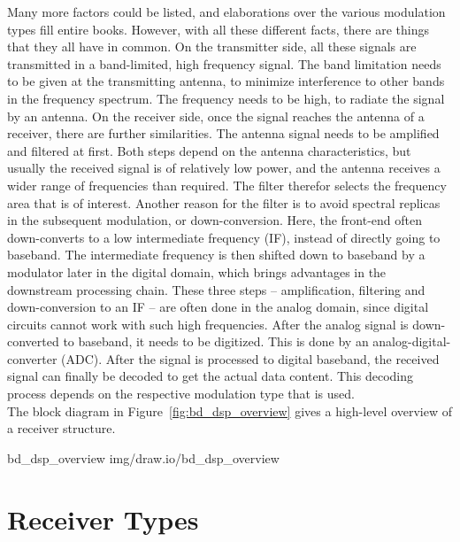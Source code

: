 Many more factors could be listed, and elaborations over the various modulation types fill entire books.
However, with all these different facts, there are things that they all have in common.
On the transmitter side, all these signals are transmitted in a band-limited, high frequency signal.
The band limitation needs to be given at the transmitting antenna, to minimize interference to other bands in the frequency spectrum.
The frequency needs to be high, to radiate the signal by an antenna.
On the receiver side, once the signal reaches the antenna of a receiver, there are further similarities.
The antenna signal needs to be amplified and filtered at first.
Both steps depend on the antenna characteristics, but usually the received signal is of relatively low power, and the antenna receives a wider range of frequencies than required.
The filter therefor selects the frequency area that is of interest.
Another reason for the filter is to avoid spectral replicas in the subsequent modulation, or down-conversion.
Here, the front-end often down-converts to a low intermediate frequency (IF), instead of directly going to baseband.
The intermediate frequency is then shifted down to baseband by a modulator later in the digital domain, which brings advantages in the downstream processing chain. %
These three steps -- amplification, filtering and down-conversion to an IF -- are often done in the analog domain, since digital circuits cannot work with such high frequencies.
After the analog signal is down-converted to baseband, it needs to be digitized.
This is done by an analog-digital-converter (ADC).
After the signal is processed to digital baseband, the received signal can finally be decoded to get the actual data content.
This decoding process depends on the respective modulation type that is used.\\

\noindent
The block diagram in Figure~\ref{fig:bd_dsp_overview} gives a high-level overview of a receiver structure.

 {bd_dsp_overview} {img/draw.io/bd_dsp_overview}

\section{Receiver Types}

